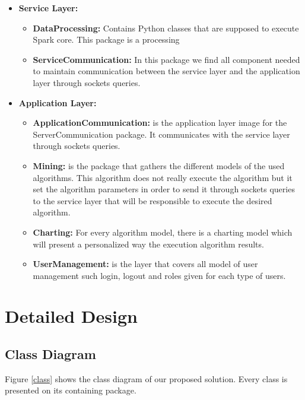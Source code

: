 \begin{itemize}
\item \textbf{Service Layer:}\\
\begin{itemize}
\item \textbf{DataProcessing:} Contains Python classes that are supposed to execute Spark core. This package is a processing \\
\item \textbf{ServiceCommunication:} In this package we find all component needed to maintain communication between the service layer and the application layer through sockets queries.\\
\end{itemize}

\item \textbf{Application Layer:}\\
\begin{itemize}
\item \textbf{ApplicationCommunication:} is the application layer image for the ServerCommunication package. It communicates with the service layer through sockets queries.\\
\item \textbf{Mining:} is the package that gathers the different models of the used algorithms. This algorithm does not really execute the algorithm but it set the algorithm parameters in order to send it through sockets queries to the service layer that will be responsible to execute the desired algorithm.\\
\item \textbf{Charting:} For every algorithm model, there is a charting model which will present a personalized way the execution algorithm results.\\
\item \textbf{UserManagement:} is the layer that covers all model of user management such login, logout and roles given for each type of users.\\
\end{itemize}
\end{itemize}




\section{Detailed Design}
\subsection{Class Diagram}
Figure \ref{class} shows the class diagram of our proposed solution. Every class is presented on its containing package.\\

